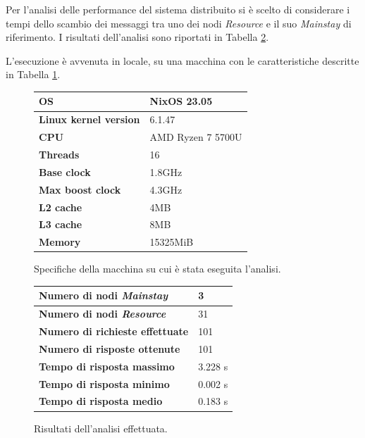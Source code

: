 \documentclass[12pt]{article}
\begin{document}
Per l'analisi delle performance del sistema distribuito si è scelto di considerare i tempi dello scambio dei messaggi tra uno dei nodi \textit{Resource} e il suo \textit{Mainstay} di riferimento. I risultati dell'analisi sono riportati in Tabella \ref{tab:analysis-specs}.

L'esecuzione è avvenuta in locale, su una macchina con le caratteristiche descritte in Tabella \ref{tab:machine-specs}.

\begin{figure}[H]
    \caption{Specifiche della macchina su cui è stata eseguita l'analisi.}
    \begin{center}
        \begin{tabular}{ | l | l | }
            \hline
            \textbf{OS} & NixOS 23.05 \\ 
            \hline
            \textbf{Linux kernel version} & 6.1.47 \\ 
            \hline
            \textbf{CPU} & AMD Ryzen 7 5700U \\
            \hline
            \textbf{Threads} & 16 \\
            \hline
            \textbf{Base clock} & 1.8GHz \\
            \hline
            \textbf{Max boost clock} & 4.3GHz \\
            \hline
            \textbf{L2 cache} & 4MB \\
            \hline
            \textbf{L3 cache} & 8MB \\
            \hline
            \textbf{Memory} & 15325MiB \\
            \hline
        \end{tabular}
    \end{center}
    \label{tab:machine-specs}
\end{figure}

\begin{figure}[H]
    \caption{Risultati dell'analisi effettuata.}
    \begin{center}
        \begin{tabular}{ | l | l | }
            \hline
            \textbf{Numero di nodi \textit{Mainstay}} & 3 \\ 
            \hline
            \textbf{Numero di nodi \textit{Resource}} & 31 \\ 
            \hline
            \textbf{Numero di richieste effettuate} & 101 \\
            \hline
            \textbf{Numero di risposte ottenute} & 101 \\
            \hline
            \textbf{Tempo di risposta massimo} & 3.228 s \\
            \hline
            \textbf{Tempo di risposta minimo} & 0.002 s \\
            \hline
            \textbf{Tempo di risposta medio} & 0.183 s \\
            \hline
        \end{tabular}
    \end{center}
    \label{tab:analysis-specs}
\end{figure}
\end{document}
